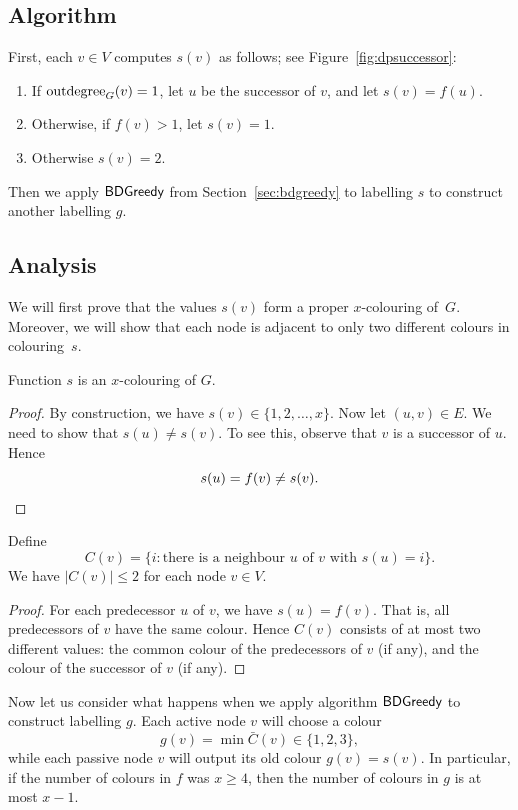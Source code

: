 \subsection{Algorithm}

First, each $v \in V$ computes $s(v)$ as follows; see Figure~\ref{fig:dpsuccessor}:
\begin{enumerate}
    \item If $\operatorname{outdegree}_G(v) = 1$, let $u$ be the successor of $v$, and let $s(v) = f(u)$.
    \item Otherwise, if $f(v) > 1$, let $s(v) = 1$.
    \item Otherwise $s(v) = 2$.
\end{enumerate}
Then we apply $\textup{\sffamily BDGreedy}$ from Section~\ref{sec:bdgreedy} to labelling $s$ to construct another labelling $g$.


\subsection{Analysis}

We will first prove that the values $s(v)$ form a proper $x$-colouring of~$G$. Moreover, we will show that each node is adjacent to only two different colours in colouring~$s$.

\begin{lemma}
    Function $s$ is an $x$-colouring of $G$.
\end{lemma}
\begin{proof}
    By construction, we have $s(v) \in \{1,2,\dotsc,x\}$. Now let $(u,v) \in E$. We need to show that $s(u) \ne s(v)$. To see this, observe that $v$ is a successor of $u$. Hence
    \[
        s(u) = f(v) \ne s(v). \qedhere
    \]
\end{proof}

\begin{lemma}
    Define
    \[
        C(v) = \{ i : \text{there is a neighbour $u$ of $v$ with $s(u) = i$} \}.
    \]
    We have $|C(v)| \le 2$ for each node $v \in V$.
\end{lemma}
\begin{proof}
    For each predecessor $u$ of $v$, we have $s(u) = f(v)$. That is, all predecessors of $v$ have the same colour. Hence $C(v)$ consists of at most two different values: the common colour of the predecessors of $v$ (if any), and the colour of the successor of $v$ (if any).
\end{proof}

Now let us consider what happens when we apply algorithm $\textup{\sffamily BDGreedy}$ to construct labelling $g$. Each active node $v$ will choose a colour \[g(v) = \min \bar{C}(v) \in \{1,2,3\},\] while each passive node $v$ will output its old colour $g(v) = s(v)$. In particular, if the number of colours in $f$ was $x \ge 4$, then the number of colours in $g$ is at most $x - 1$.

